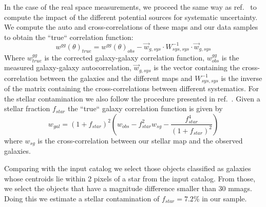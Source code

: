 \documentclass[\docopts]{\docclass}
\begin{document}
In the case of the real space measurements, we proceed the same way as ref.~\citep{2016MNRAS.455.4301C} to compute the impact of the different potential sources for systematic uncertainty. We compute the auto and cross-correlations of these maps and our data samples to obtain the ``true`` correlation function:
\begin{equation}
w^{gg}(\theta)_{true} =w^{gg}(\theta)_{obs} -  \vec{w}_{g,sys} \cdot W_{sys,sys}^{-1} \cdot \vec{w}_{g,sys}
\end{equation}
Where $w^{gg}_{true}$ is the corrected galaxy-galaxy correlation function, $w^{gg}_{obs}$ is the measured galaxy-galaxy autocorrelation, $\vec{w}_{g,sys}$ is the vector containing the cross-correlation between the galaxies and the different maps and $W_{sys,sys}^{-1}$ is the inverse of the matrix containing the cross-correlations between different systematics. For the stellar contamination we also follow the procedure presented in ref.~\citep{2016MNRAS.455.4301C}. Given a stellar fraction $f_{star}$ the ``true`` galaxy correlation function is given by
\begin{equation}
w_{gal} = \left(1+f_{star}\right)^{2}\left(w_{obs} - f_{star}^{2}w_{sg} - \frac{f_{star}^{4}}{\left(1+f_{star}\right)^{2}}\right)
\end{equation}
where $w_{sg}$ is the cross-correlation between our stellar map and the observed galaxies.

Comparing with the input catalog we select those objects classified as galaxies whose centroids lie within 2 pixels of a star from the input catalog. From those, we select the objects that have a magnitude difference smaller than 30 mmags. Doing this we estimate a stellar contamination of $f_{star}=7.2\%$ in our sample.
\end{document}
